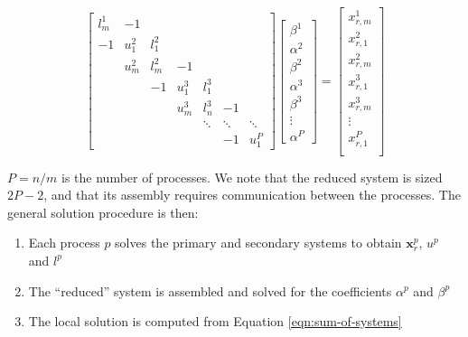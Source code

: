 \begin{equation} \label{eqn:reduced-system}
\begin{bmatrix}
l^1_m & -1 \\
-1    & u^2_1 & l^2_1 \\
      & u^2_m & l^2_m & -1 \\
      &       & -1    & u^3_1 & l^3_1 \\
      &       &       & u^3_m & l^3_n  & -1 \\
      &       &       &       & \ddots & \ddots & \ddots \\
      &       &       &       &        & -1     & u^P_1
\end{bmatrix}
\begin{bmatrix}
\beta^1 \\
\alpha^2 \\
\beta^2 \\
\alpha^3 \\
\beta^3 \\
\vdots \\
\alpha^P
\end{bmatrix}
=
\begin{bmatrix}
x_{r,m}^1 \\
x_{r,1}^2 \\
x_{r,m}^2 \\
x_{r,1}^3 \\
x_{r,m}^3 \\
\vdots \\
x_{r,1}^P \\
\end{bmatrix}
\end{equation}

$P = n/m$ is the number of processes.
We note that the reduced system is sized $2P-2$,
and that its assembly requires communication between the processes.
The general solution procedure is then:

\begin{enumerate}
    \item Each process $p$ solves the primary and secondary systems
        to obtain $\boldsymbol{x}_r^p$, $u^p$ and $l^p$
    \item The ``reduced'' system is assembled and solved for
        the coefficients $\alpha^p$ and $\beta^p$
    \item The local solution is computed from Equation \ref{eqn:sum-of-systems}
\end{enumerate}


